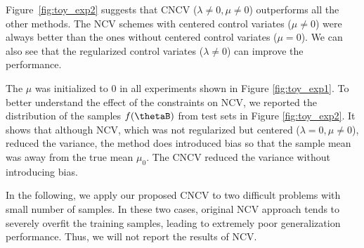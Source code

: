 \documentclass[runningheads]{llncs}
\begin{document}
Figure~\ref{fig:toy_exp2} suggests that CNCV ($\lambda \neq 0, \mu \neq 0$) outperforms all the other methods. The NCV schemes with centered control variates ($\mu\neq 0$) were always better than the ones without centered control variates ($\mu = 0$). We can also see that the regularized control variates ($\lambda\neq 0$) can improve the performance. 

The $\mu$ was initialized to 0 in all experiments shown in Figure \ref{fig:toy_exp1}. To better understand the effect of the constraints on NCV, we reported the distribution of the samples $f(\thetaB)$ from test sets in Figure \ref{fig:toy_exp2}. It shows that although NCV, which was not regularized but centered ($\lambda =0, \mu \neq 0$), reduced the variance, the method does introduced bias so that the sample mean was away from the true mean $\mu_0$. The CNCV reduced the variance without introducing bias. 

In the following, we apply our proposed CNCV to two difficult problems with small number of samples. In these two cases, original NCV approach tends to severely overfit the training samples, leading to extremely poor generalization performance. Thus, we will not report the results of NCV. 
\end{document}
